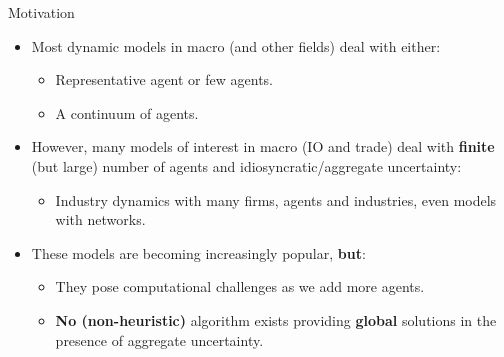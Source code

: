 \documentclass[aspectratio=169,10pt]{beamer}
\newcommand{\emphcolor}[1]{\textbf{\textcolor{emphcolorval}{#1}}}
\begin{document}
\begin{frame}{Motivation}
	\begin{itemize}
		\item Most dynamic models in macro (and other fields) deal with either:\vspace{0.1in}
		\begin{itemize}
		\item Representative agent or few agents.\vspace{0.1in}
		\item A continuum of agents.\vspace{0.1in}
		\end{itemize} 
	\item However, many models of interest in macro (IO and trade) deal with \emphcolor{finite} (but large) number of agents and idiosyncratic/aggregate uncertainty:\vspace{0.1in}
		\begin{itemize}
		\item Industry dynamics with many firms, agents and industries,  even models with networks.\vspace{0.1in}
		
	\end{itemize}
	\item These models are becoming increasingly popular, \emphcolor{but}:\vspace{0.1in}
		\begin{itemize}
			\item They pose computational challenges as we add more agents.\vspace{0.1in}
			\item \emphcolor{No (non-heuristic)} algorithm exists providing \emphcolor{global} solutions in the presence of aggregate uncertainty.  
		\end{itemize}	
	\end{itemize}	
	


				

\end{frame}
\end{document}
